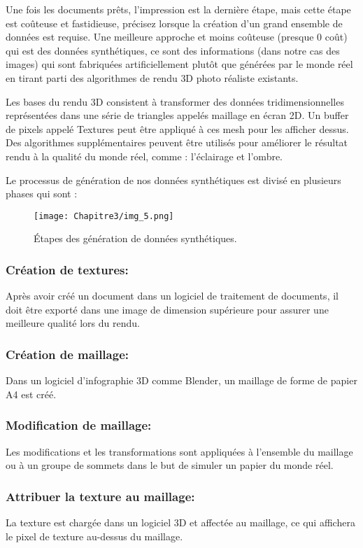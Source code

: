          Une fois les documents prêts, l'impression est la dernière étape, mais cette étape est coûteuse et fastidieuse, précisez lorsque la création d'un grand ensemble de données est requise. Une meilleure approche et moins coûteuse (presque 0 coût) qui est des données synthétiques, ce sont des informations (dans notre cas des images) qui sont fabriquées artificiellement plutôt que générées par le monde réel en tirant parti des algorithmes de rendu 3D photo réaliste existants.

          Les bases du rendu 3D consistent à transformer des données tridimensionnelles représentées dans une série de triangles appelés maillage en écran 2D. Un buffer de pixels appelé Textures peut être appliqué à ces mesh pour les afficher dessus. Des algorithmes supplémentaires peuvent être utilisés pour améliorer le résultat rendu à la qualité du monde réel, comme : l'éclairage et l'ombre.

          Le processus de génération de nos données synthétiques est divisé en plusieurs phases qui sont :
          \begin{figure}[H]
               \centering
               \texttt{[image: Chapitre3/img\_5.png]}
               \caption{Étapes des génération de données synthétiques.}
               \label{img6}
               \end{figure}

          \subsubsection{Création de textures:} Après avoir créé un document dans un logiciel de traitement de documents, il doit être exporté dans une image de dimension supérieure pour 	assurer une meilleure qualité lors du rendu.
          \subsubsection{Création de maillage:} Dans un logiciel d'infographie 3D comme Blender, un maillage de forme de papier A4 est créé.
          \subsubsection{Modification de maillage:} Les modifications et les transformations sont appliquées à l'ensemble du maillage ou à un groupe de sommets dans le but de simuler un papier du monde réel. 
          \subsubsection{Attribuer la texture au maillage:} La texture est chargée dans un logiciel 3D et affectée au maillage, ce qui affichera le pixel de texture au-dessus du maillage.

